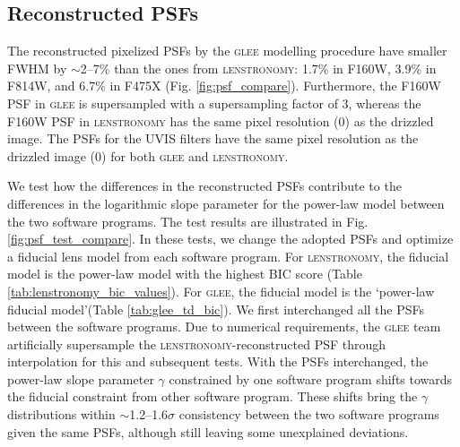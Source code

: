 \documentclass[longauth]{aa}
\begin{document}
%


\subsection{Reconstructed PSFs} \label{sec:psf_comparison}

The reconstructed pixelized PSFs by the \textsc{glee} modelling procedure have smaller FWHM by $\sim$2--7\% than the ones from \textsc{lenstronomy}: 1.7\% in F160W, 3.9\% in F814W, and 6.7\% in F475X (Fig. \ref{fig:psf_compare}). Furthermore, the F160W PSF in \textsc{glee} is supersampled with a supersampling factor of 3, whereas the F160W PSF in \textsc{lenstronomy} has the same pixel resolution (0) as the drizzled image. The PSFs for the UVIS filters have the same pixel resolution as the drizzled image (0) for both \textsc{glee} and \textsc{lenstronomy}. 


We test how the differences in the reconstructed PSFs contribute to the differences in the logarithmic slope parameter for the power-law model between the two software programs. The test results are illustrated in Fig. \ref{fig:psf_test_compare}. In these tests, we change the adopted PSFs and optimize a fiducial lens model from each software program. For \textsc{lenstronomy}, the fiducial model is the power-law model with the highest BIC score (Table \ref{tab:lenstronomy_bic_values}). For \textsc{glee}, the fiducial model is the `power-law fiducial model'(Table \ref{tab:glee_td_bic}). We first interchanged all the PSFs between the software programs. Due to numerical requirements, the \textsc{glee} team artificially supersample the \textsc{lenstronomy}-reconstructed PSF through interpolation for this and subsequent tests. With the PSFs interchanged, the power-law slope parameter $\gamma$ constrained by one software program shifts towards the fiducial constraint from other software program. These shifts bring the $\gamma$ distributions within $\sim$1.2--1.6$\sigma$ consistency between the two software programs given the same PSFs, although still leaving some unexplained deviations. 
\end{document}
